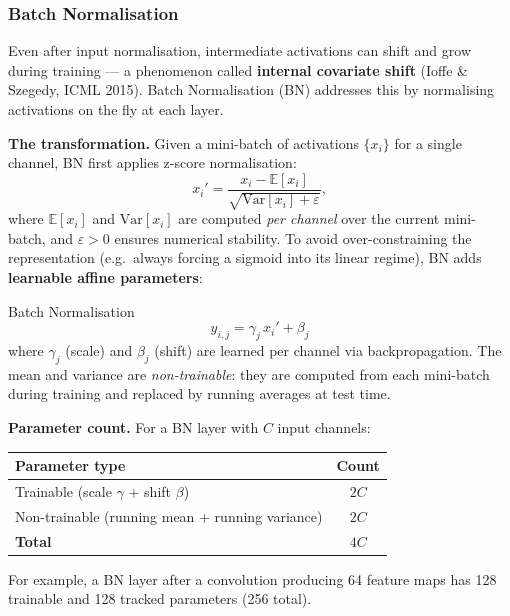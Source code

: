 \documentclass[11pt,a4paper]{article}
\newcommand{\term}[1]{\textcolor{DefGreen}{\textbf{#1}}}
\begin{document}
\subsubsection{Batch Normalisation}
\label{sec:batchnorm2}

Even after input normalisation, intermediate activations can shift and grow during training — a phenomenon called \term{internal covariate shift} (Ioffe \& Szegedy, ICML 2015). Batch Normalisation (BN) addresses this by normalising activations on the fly at each layer.

\textbf{The transformation.} Given a mini-batch of activations $\{x_i\}$ for a single channel, BN first applies z-score normalisation:
\[
x_i' = \frac{x_i - \mathbb{E}[x_i]}{\sqrt{\mathrm{Var}[x_i] + \varepsilon}},
\]
where $\mathbb{E}[x_i]$ and $\mathrm{Var}[x_i]$ are computed \emph{per channel} over the current mini-batch, and $\varepsilon>0$ ensures numerical stability. To avoid over-constraining the representation (e.g.\ always forcing a sigmoid into its linear regime), BN adds \textbf{learnable affine parameters}:

\begin{defbox}{Batch Normalisation}
\[
y_{i,j} = \gamma_j \, x_i' + \beta_j
\]
where $\gamma_j$ (scale) and $\beta_j$ (shift) are learned per channel via backpropagation. The mean and variance are \emph{non-trainable}: they are computed from each mini-batch during training and replaced by running averages at test time.
\end{defbox}

\textbf{Parameter count.} For a BN layer with $C$ input channels:

\begin{center}
\begin{tabular}{lc}
\toprule
Parameter type & Count \\
\midrule
Trainable (scale $\gamma$ + shift $\beta$) & $2C$ \\
Non-trainable (running mean + running variance) & $2C$ \\
\midrule
\textbf{Total} & $4C$ \\
\bottomrule
\end{tabular}
\end{center}

For example, a BN layer after a convolution producing 64 feature maps has 128 trainable and 128 tracked parameters (256 total).
\end{document}
